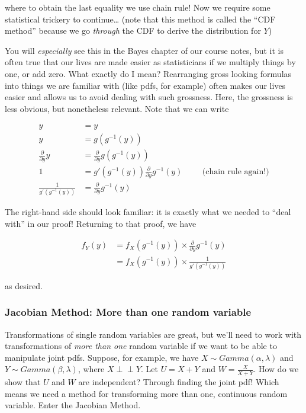 \documentclass[
  letterpaper,
  DIV=11,
  numbers=noendperiod]{scrreprt}
\begin{document}
where to obtain the last equality we use chain rule! Now we require some
statistical trickery to continue\ldots{} (note that this method is
called the ``CDF method'' because we go \emph{through} the CDF to derive
the distribution for \(Y\))

You will \emph{especially} see this in the Bayes chapter of our course
notes, but it is often true that our lives are made easier as
statisticians if we multiply things by one, or add zero. What exactly do
I mean? Rearranging gross looking formulas into things we are familiar
with (like pdfs, for example) often makes our lives easier and allows us
to avoid dealing with such grossness. Here, the grossness is less
obvious, but nonetheless relevant. Note that we can write

\begin{align*}
    y & = y \\
    y & = g(g^{-1}(y)) \\
    \frac{\partial}{\partial y} y & = \frac{\partial}{\partial y} g(g^{-1}(y)) \\
    1 & = g'(g^{-1}(y)) \frac{\partial}{\partial y} g^{-1}(y) \hspace{1cm} \text{(chain rule again!)} \\
    \frac{1}{g'(g^{-1}(y))} & = \frac{\partial}{\partial y} g^{-1}(y)
\end{align*}

The right-hand side should look familiar: it is exactly what we needed
to ``deal with'' in our proof! Returning to that proof, we have

\begin{align*}
    f_Y(y) & = f_X(g^{-1}(y)) \times \frac{\partial}{\partial y} g^{-1}(y) \\
    & = f_X(g^{-1}(y)) \times \frac{1}{g'(g^{-1}(y))} 
\end{align*}

as desired.

\subsubsection{Jacobian Method: More than one random
variable}\label{jacobian-method-more-than-one-random-variable}

Transformations of single random variables are great, but we'll need to
work with transformations of \emph{more than one} random variable if we
want to be able to manipulate joint pdfs. Suppose, for example, we have
\(X \sim Gamma(\alpha, \lambda)\) and \(Y \sim Gamma(\beta, \lambda)\),
where \(X \perp\!\!\!\perp Y\). Let \(U = X + Y\) and
\(W = \frac{X}{X + Y}\). How do we show that \(U\) and \(W\) are
independent? Through finding the joint pdf! Which means we need a method
for transforming more than one, continuous random variable. Enter the
Jacobian Method.
\end{document}

